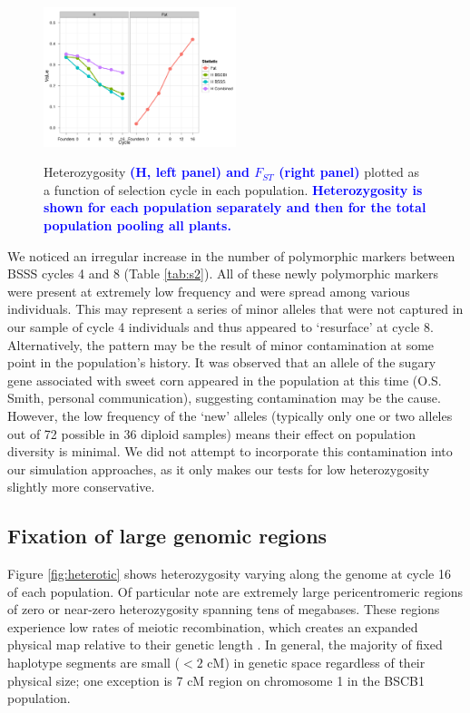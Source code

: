 \documentclass[twocolumn,twoside,letterpaper]{article}
\newcommand{\rev}[1]{\textcolor{blue}{\bf #1}}
\begin{document}
\begin{figure}[tb]   
  \begin{center}
   \vspace{-0mm}
   \includegraphics[width=0.5\textwidth]{fig2}
   \renewcommand{\baselinestretch}{0.9}
   \vspace{-3mm}
   \caption{Heterozygosity \rev{(H, left panel) and $F_{ST}$ (right panel)} plotted as a function of selection cycle in each population. \rev{Heterozygosity is shown for each population separately and then for the total population pooling all plants.}
} 
\vspace{-6mm}
    \label{fig:decline}
  \end{center}
\end{figure}

We noticed an irregular increase in the number of polymorphic markers between BSSS cycles 4 and 8 (Table \ref{tab:s2}). 
All of these newly polymorphic markers were present at extremely low frequency and were spread among various individuals. 
This may represent a series of minor alleles that were not captured in our sample of cycle 4 individuals and thus appeared to ‘resurface’ at cycle 8. 
Alternatively, the pattern may be the result of minor contamination at some point in the population’s history. 
It was observed that an allele of the sugary gene associated with sweet corn appeared in the population at this time (O.S. Smith, personal communication), suggesting contamination may be the cause. 
However, the low frequency of the ‘new’ alleles (typically only one or two alleles out of 72 possible in 36 diploid samples) means their effect on population diversity is minimal.  
We did not attempt to incorporate this contamination into our simulation approaches, as it only makes our tests for low heterozygosity slightly more conservative.

\subsection*{Fixation of large genomic regions}
Figure \ref{fig:heterotic} shows heterozygosity varying along the genome at cycle 16 of each population. 
Of particular note are extremely large pericentromeric regions of zero or near-zero heterozygosity spanning tens of megabases. 
These regions experience low rates of meiotic recombination, which creates an expanded physical map relative to their genetic length \citep{ganal2011a-large}. 
In general, the majority of fixed haplotype segments are small ($<2$ cM) in genetic space regardless of their physical size; one exception is 7 cM region on chromosome 1 in the BSCB1 population. 
\end{document}
